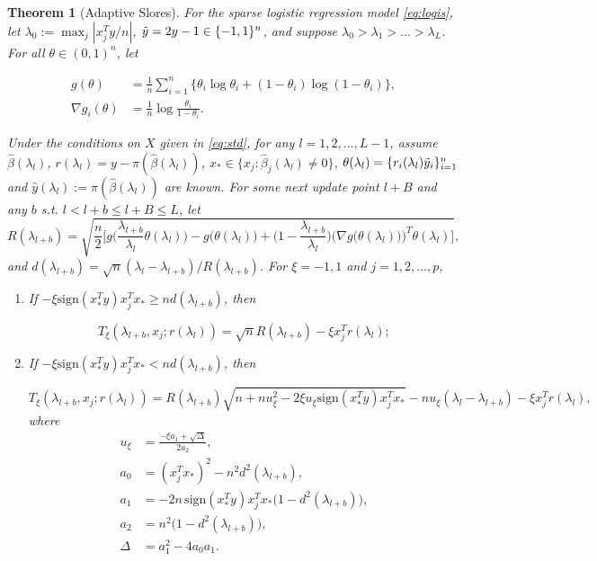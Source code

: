 \documentclass[]{interact}
\theoremstyle{plain}%
\newtheorem{theorem}{Theorem}[section]
\theoremstyle{definition}
\theoremstyle{remark}
\providecommand{\sign}{\textrm{sign}}
\begin{document}
\begin{theorem}[Adaptive Slores]
For the sparse logistic regression model \eqref{eq:logis}, let $\lambda_0:=\max_j|x_j^Ty/n|$, $\Tilde{y}=2y-1\in\{-1,1\}^n$, and suppose $\lambda_0>\lambda_1>...>\lambda_L$. For all $\theta\in(0,1)^n$, let 

\begin{equation}
    \begin{split}
        g(\theta)&=\frac{1}{n}\sum_{i=1}^n\{\theta_i\log \theta_i+(1-\theta_i)\log(1-\theta_i)\},\\
    \nabla g_i(\theta) &= \frac{1}{n}\log\frac{\theta_i}{1-\theta_i}.
    \end{split}
\end{equation}

Under the conditions on $X$ given in \eqref{eq:std}, for any $l=1,2,...,L-1$, assume $\hat{\beta}(\lambda_l)$, $r(\lambda_l)=y-\pi(\hat{\beta}(\lambda_l))$, $x_*\in\{x_j:\hat{\beta}_j(\lambda_l)\neq0\} $, $\theta(\lambda_l)=\{r_i(\lambda_l)\Tilde{y}_i\}_{i=1}^n$ and $\hat{y}(\lambda_l):=\pi(\hat{\beta}(\lambda_l))$ are known. For some next update point $l+B$ and any $b$ s.t. $l<l+b\leq l+B\leq L$, let
\begin{equation}
  R(\lambda_{l+b}) = \sqrt{\frac{n}{2} \bigg[g\bigg(\frac{\lambda_{l+b}}{\lambda_l}\theta(\lambda_l)\bigg) - g\bigg(\theta(\lambda_l)\bigg) + \bigg(1 - \frac{\lambda_{l+b}}{\lambda_l}\bigg) \bigg(\nabla g\big(\theta(\lambda_l)\big)\bigg)^T\theta(\lambda_l)\bigg]},
\end{equation}
and $d(\lambda_{l+b})=\sqrt{n}(\lambda_l-\lambda_{l+b})/R(\lambda_{l+b})$. For $\xi = -1,1$ and $j=1,2,...,p$,

\begin{enumerate}
    \item If $-\xi \sign(x_*^Ty)x_j^Tx_*\geq nd(\lambda_{l+b})$, then
    
    \begin{equation}
        T_\xi(\lambda_{l+b},x_j;r(\lambda_l))=\sqrt{n}R(\lambda_{l+b})-\xi x_j^Tr(\lambda_l);
    \end{equation}
    
    \item If $-\xi \sign(x_*^Ty)x_j^Tx_*< nd(\lambda_{l+b})$, then
    
    \begin{equation}
        T_\xi(\lambda_{l+b},x_j;r(\lambda_l))=R(\lambda_{l+b})\sqrt{n+nu_\xi^2-2\xi u_\xi \sign(x_*^Ty)x_j^Tx_*}-nu_\xi(\lambda_l-\lambda_{l+b})-\xi x_j^Tr(\lambda_l),
    \end{equation}
    where
    \begin{align}
        u_\xi&=\frac{-\xi a_1+\sqrt{\Delta}}{2a_2},\\
        a_0&=(x_j^Tx_*)^2-n^2d^2(\lambda_{l+b}),\nonumber\\
        a_1&=-2n\,\sign(x_*^Ty)x_j^Tx_*\big(1-d^2(\lambda_{l+b})\big),\nonumber\\
        a_2&=n^2\big(1-d^2(\lambda_{l+b})\big),\nonumber\\
        \Delta&=a_1^2-4a_0a_1.\nonumber
    \end{align}
\end{enumerate}


\end{theorem}
\end{document}

